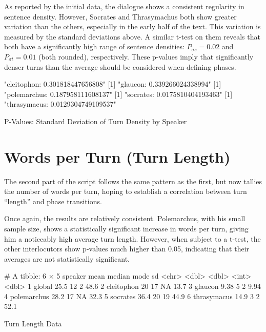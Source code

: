\documentclass[noraggedright]{turabian-researchpaper}
\begin{document}
As reported by the initial data, the dialogue shows a consistent regularity in
sentence density. However, Socrates and Thrasymachus both show greater variation
than the others, especially in the early half of the text. 
This variation is measured by the standard deviations above. A similar t-test on
them reveals that both have a significantly high range of sentence densities:
$P_{\sigma s} = 0.02$ and $P_{\sigma t} = 0.01$ (both rounded), respectively. These
p-values imply that significantly denser turns than the average should be
considered when defining phases.

\begin{table}
\begin{Schunk}
\begin{Soutput}
[1] "cleitophon: 0.301818447656808"
[1] "glaucon: 0.339266024338994"
[1] "polemarchus: 0.187958111608137"
[1] "socrates: 0.0175810404193463"
[1] "thrasymacus: 0.0129304749109537"
\end{Soutput}
\end{Schunk}
\caption{P-Values: Standard Deviation of Turn Density by Speaker}
\label{tab:DSDPval}
\end{table}

\section{Words per Turn (Turn Length)}


The second part of the script follows the same pattern as the first, but now
tallies the number of words per turn, hoping to establish a correlation between
turn ``length'' and phase transitions.

Once again, the results are relatively consistent. Polemarchus, with his small
sample size, shows a statistically significant increase in words per turn,
giving him a noticeably high average turn length. However, when subject to a
t-test, the other interlocutors show p-values much higher than 0.05, indicating
that their averages are not statistically significant.

\begin{table}[htbp]
\begin{Schunk}
\begin{Soutput}
# A tibble: 6 × 5
  speaker      mean median  mode    sd
  <chr>       <dbl>  <dbl> <int> <dbl>
1 global      25.5      12     2 48.6 
2 cleitophon  20        17    NA 13.7 
3 glaucon      9.38      5     2  9.94
4 polemarchus 28.2      17    NA 32.3 
5 socrates    36.4      20    19 44.9 
6 thrasymacus 14.9       3     2 52.1 
\end{Soutput}
\end{Schunk}
\caption{Turn Length Data}
\label{tab:LengthData}
\end{table}
\end{document}
